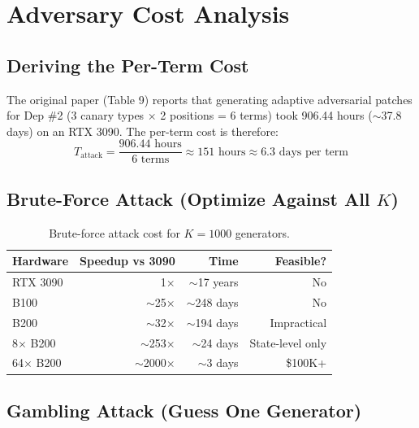 \documentclass[11pt,a4paper]{article}
\begin{document}
\section{Adversary Cost Analysis}

\subsection{Deriving the Per-Term Cost}

The original paper (Table 9) reports that generating adaptive adversarial patches for Dep \#2 (3 canary types $\times$ 2 positions = 6 terms) took 906.44 hours ($\sim$37.8 days) on an RTX 3090. The per-term cost is therefore:
\begin{equation}
    T_{\text{attack}} = \frac{906.44 \text{ hours}}{6 \text{ terms}} \approx 151 \text{ hours} \approx 6.3 \text{ days per term}
\end{equation}

\subsection{Brute-Force Attack (Optimize Against All $K$)}

\begin{table}[H]
\centering
\caption{Brute-force attack cost for $K=1000$ generators.}
\begin{tabular}{lrrr}
\toprule
\textbf{Hardware} & \textbf{Speedup vs 3090} & \textbf{Time} & \textbf{Feasible?} \\
\midrule
RTX 3090 & 1$\times$ & $\sim$17 years & No \\
B100 & $\sim$25$\times$ & $\sim$248 days & No \\
B200 & $\sim$32$\times$ & $\sim$194 days & Impractical \\
8$\times$ B200 & $\sim$253$\times$ & $\sim$24 days & State-level only \\
64$\times$ B200 & $\sim$2000$\times$ & $\sim$3 days & \$100K+ \\
\bottomrule
\end{tabular}
\label{tab:brute_force}
\end{table}

\subsection{Gambling Attack (Guess One Generator)}
\end{document}
